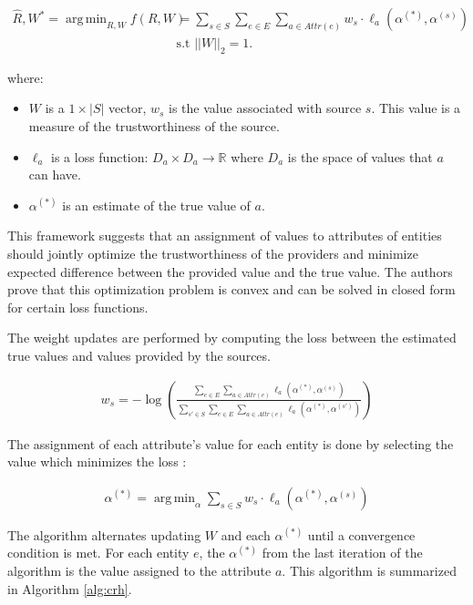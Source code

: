 \documentclass{acm_proc_article-sp}
\DeclareMathOperator*{\argmin}{arg\,min}
\begin{document}
\begin{align}
\hat{R}, W^* = \argmin_{R,W} f(R, W) & = \sum_{s \in S} \sum_{e \in E} \sum_{a \in Attr(e)} w_s \cdot \ell_a(\alpha^{(*)}, \alpha^{(s)}) \\
& \text{s.t } ||W||_2 =1. \nonumber 
\end{align}

where: 

\begin{itemize}
\item $W$ is a $1\times|S|$ vector, $w_s$ is the value associated with source $s$. This value is a measure of the trustworthiness of the source. 
\item $\ell_a$ is a loss function: $D_a \times D_a \rightarrow \mathbb{R}$ where $D_a$ is the space of values that $a$ can have. 
\item $\alpha^{(*)}$ is an estimate of the true value of $a$. 
\end{itemize}

This framework suggests that an assignment of values to attributes of entities should jointly optimize the trustworthiness of the providers and minimize expected difference between the provided value and the true value. The authors prove that this optimization problem is convex and can be solved in closed form for certain loss functions. 

The weight updates are performed by computing the loss between the estimated true values and values provided by the sources. 

\begin{align}
w_s = - \log \left ( \frac{\sum_{e \in E} \sum_{a \in Attr(e)} \ell_a(\alpha^{(*)}, \alpha^{(s)})}{\sum_{s' \in S} \sum_{e \in E}  \sum_{a \in Attr(e)} \ell_a(\alpha^{(*)}, \alpha^{(s')})} \right )
\end{align}

The assignment of each attribute's value for each entity is done by selecting the value which minimizes the loss : 

\begin{align}
\alpha^{(*)} = \argmin_\alpha \sum_{s \in S} w_s \cdot \ell_a(\alpha^{(*)}, \alpha^{(s)})
\end{align}

The algorithm alternates updating $W$ and each $\alpha^{(*)}$ until a convergence condition is met. For each entity $e$, the $\alpha^{(*)}$ from the last iteration of the algorithm is the value assigned to the attribute $a$. This algorithm is summarized in Algorithm \ref{alg:crh}. 
\end{document}
